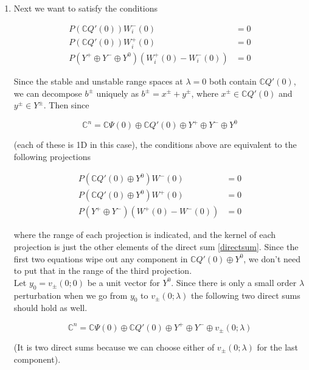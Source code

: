 \documentclass[12pt]{article}
\def\C{{\mathbb C}}
\begin{document}
% 

\begin{enumerate}

\item Next we want to satisfy the conditions

\begin{align*}
P(\C Q'(0))W_i^-(0) &= 0 \\
P(\C Q'(0))W_i^+(0) &= 0 \\
P(Y^+ \oplus Y^- \oplus Y^0) ( W_i^+(0) - W_i^-(0) ) &= 0
\end{align*}

Since the stable and unstable range spaces at $\lambda = 0$ both contain $\C Q'(0)$, we can decompose $b^\pm$ uniquely as $b^\pm = x^\pm + y^\pm$, where $x^\pm \in \C Q'(0)$ and $y^\pm \in Y^\pm$. Then since

\begin{equation}\label{directsum}
\C^n = \C\Psi(0) \oplus \C Q'(0) \oplus Y^+ \oplus Y^- \oplus Y^0
\end{equation}

(each of these is 1D in this case), the conditions above are equivalent to the following projections

\begin{align*}
P(\C Q'(0) \oplus Y^0 )W^-(0) &= 0 \\
P(\C Q'(0) \oplus Y^0 )W^+(0) &= 0 \\
P(Y^+ \oplus Y^-) (W^+(0) - W^-(0) ) &= 0
\end{align*}

where the range of each projection is indicated, and the kernel of each projection is just the other elements of the direct sum \eqref{directsum}. Since the first two equations wipe out any component in $\C Q'(0) \oplus Y^0$, we don't need to put that in the range of the third projection. \\

Let $y_0 = v_\pm(0; 0)$ be a unit vector for $Y^0$. Since there is only a small order $\lambda$ perturbation when we go from $y_0$ to $v_\pm(0; \lambda)$ the following two direct sums should hold as well.

\begin{equation}\label{directsum2}
\C^n = \C\Psi(0) \oplus \C Q'(0) \oplus Y^+ \oplus Y^- \oplus v_\pm(0; \lambda)
\end{equation}

(It is two direct sums because we can choose either of $v_\pm(0; \lambda)$ for the last component).\\


\end{enumerate}
\end{document}
